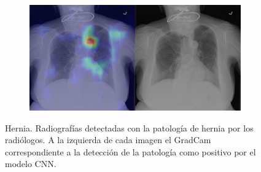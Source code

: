 \begin{figure}[b]
\begin{subfigure}{0.4\textwidth}
    \end{subfigure}
    \begin{subfigure}{0.4\textwidth}
        \centering
        \includegraphics[width=1.0\textwidth]{Chapters/5. Conclusiones/img/Hernia/1_1_00029188_001.png}
    \end{subfigure}

    \caption{Hernia. Radiografías detectadas con la patología de hernia por los
                    radiólogos. A la izquierda de cada imagen el GradCam correspondiente a la detección
                    de la patología como positivo por el modelo CNN.}
\end{figure}


